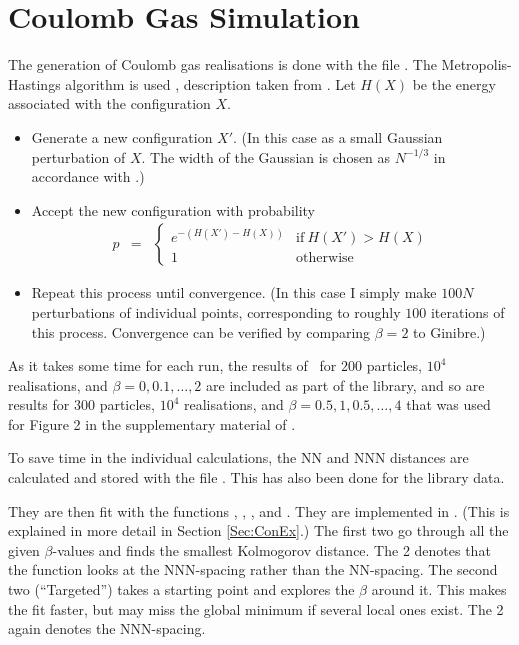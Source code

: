 \documentclass[a4paper,11pt]{article}
\numberwithin{equation}{section}
\begin{document}
\section{Coulomb Gas Simulation}
The generation of Coulomb gas realisations is done with the file \fileCoulombGenerate.
The Metropolis-Hastings algorithm is used \cite{MetropolisHastings,Metropolis}, description taken from \cite{PhD_AM}.
Let $H(X)$ be the energy associated with the configuration $X$.
\begin{itemize}
	\item Generate a new configuration $X'$. (In this case as a small Gaussian perturbation of $X$. The width of the Gaussian is chosen as $N^{-1/3}$ in accordance with \cite{Metropolis}.)
	\item Accept the new configuration with probability
	\begin{eqnarray}
	p &=& \begin{cases}
	e^{- (H(X') -  H(X))} &\text{if}\ H(X') >  H(X)\\
	1&\text{otherwise}
	\end{cases}
	\end{eqnarray}
	\item Repeat this process until convergence. (In this case I simply make $100N$ perturbations of individual points, corresponding to roughly $100$ iterations of this process. Convergence can be verified by comparing $\beta=2$ to Ginibre.)
\end{itemize}
As it takes some time for each run, the results of \fileCoulombGenerate\ for $200$ particles, $10^4$ realisations, and $\beta=0,0.1,\dots,2$ are included as part of the library, and so are results for $300$ particles, $10^4$ realisations, and $\beta=0.5,1,0.5,\dots,4$ that was used for Figure 2 in the supplementary material of \cite{AKMP}.

To save time in the individual calculations, the NN and NNN distances are calculated and stored with the file \fileCoulombDistCalc. This has also been done for the library data.

They are then fit with the functions \fileCoulombGasFit, \fileCoulombGasFitTwo, \fileCoulombGasFitTargeted, and \fileCoulombGasFitTwoTargeted. They are implemented in \fileBuzzardRead. (This is explained in more detail in Section \ref{Sec:ConEx}.) The first two go through all the given $\beta$-values and finds the smallest Kolmogorov distance. The 2 denotes that the function looks at the NNN-spacing rather than the NN-spacing. The second two (``Targeted'') takes a starting point and explores the $\beta$ around it. This makes the fit faster, but may miss the global minimum if several local ones exist. The 2 again denotes the NNN-spacing.
\end{document}
